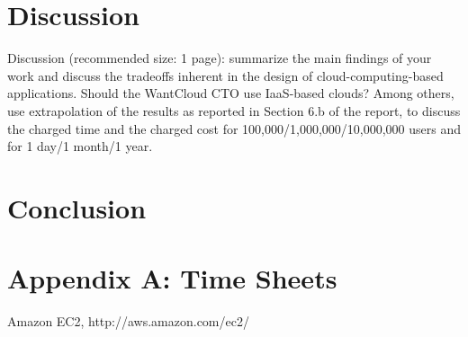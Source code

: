 \documentclass[twoside]{article}
\begin{document}
\begin{multicols}{2}

\section{Discussion}
Discussion (recommended size: 1 page): summarize the main findings of your work and discuss the tradeoffs inherent in the design of cloud-computing-based applications. Should the WantCloud CTO use IaaS-based clouds? Among others, use extrapolation of the results as reported in Section 6.b of the report, to discuss the charged time and the charged cost for 100,000/1,000,000/10,000,000 users and for 1 day/1 month/1 year.


\section{Conclusion}


\section{Appendix A: Time Sheets}


\begin{thebibliography}{99} %

Amazon EC2, http://aws.amazon.com/ec2/

\end{thebibliography}


\end{multicols}
\end{document}
